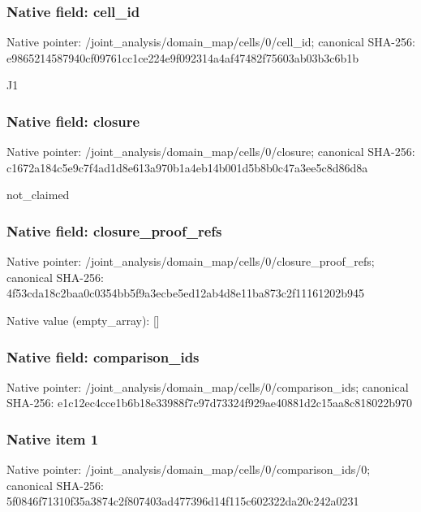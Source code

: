 \documentclass[10pt,a4paper]{article}
\begin{document}
\subsubsection{Native field: cell\_id}


Native pointer: /joint\_analysis/domain\_m\allowbreak{}ap/cells/0/cell\_id; canonical SHA-256: e9865214587940cf09761cc1\allowbreak{}ce224e9f092314a4af47482f\allowbreak{}75603ab03b3c6b1b


J1


\subsubsection{Native field: closure}


Native pointer: /joint\_analysis/domain\_m\allowbreak{}ap/cells/0/closure; canonical SHA-256: c1672a184c5e9c7f4ad1d8e6\allowbreak{}13a970b1a4eb14b001d5b8b0\allowbreak{}c47a3ee5c8d86d8a


not\_claimed


\subsubsection{Native field: closure\_proof\_refs}


Native pointer: /joint\_analysis/domain\_m\allowbreak{}ap/cells/0/closure\_proof\allowbreak{}\_refs; canonical SHA-256: 4f53cda18c2baa0c0354bb5f\allowbreak{}9a3ecbe5ed12ab4d8e11ba87\allowbreak{}3c2f11161202b945



Native value (empty\_array): []



\subsubsection{Native field: comparison\_ids}


Native pointer: /joint\_analysis/domain\_m\allowbreak{}ap/cells/0/comparison\_id\allowbreak{}s; canonical SHA-256: e1c12ec4cce1b6b18e33988f\allowbreak{}7c97d73324f929ae40881d2c\allowbreak{}15aa8c818022b970



\subsubsection{Native item 1}


Native pointer: /joint\_analysis/domain\_m\allowbreak{}ap/cells/0/comparison\_id\allowbreak{}s/0; canonical SHA-256: 5f0846f71310f35a3874c2f8\allowbreak{}07403ad477396d14f115c602\allowbreak{}322da20c242a0231
\end{document}

